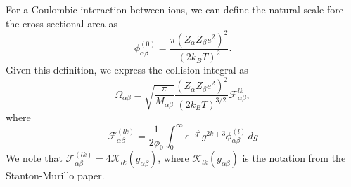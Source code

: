 \documentclass[a4paper,11pt]{report}
\begin{document}
For a Coulombic interaction between ions, we can define the natural scale fore the cross-sectional area as
\begin{equation}
    \phi^{(0)}_{\alpha \beta} = \frac{ \pi \left (Z_\alpha Z_\beta e^2 \right)^2}{ \left(2 k_B T\right)^2}.
\end{equation}
Given this definition, we express the collision integral as
\begin{equation}
    \Omega_{\alpha \beta} = \sqrt{ \frac{\pi }{M_{\alpha \beta}}} \frac{( Z_\alpha Z_\beta e^2)^2 }{(2 k_B T )^{3/2}} \mathcal{F}^{lk}_{\alpha \beta},
\end{equation}
where
\begin{equation}
    \mathcal{F}^{(lk)}_{\alpha \beta} = \frac{1}{2 \phi_0} \int_0^\infty e^{-g^2} g^{2k+3} \phi_{\alpha \beta}^{(l)} \, dg
\end{equation}
We note that $\mathcal{F}^{(lk)}_{\alpha \beta} = 4 \mathcal{K}_{lk}(g_{\alpha \beta})$, where $\mathcal{K}_{lk}(g_{\alpha \beta})$ is the notation from the Stanton-Murillo paper.

\end{document}
